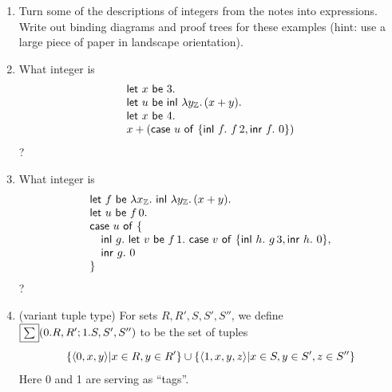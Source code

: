 \documentclass[runningheads,12pt]{llncs}
\newcommand{\itletmac}[2]{\mathsf{let}\ {#2}\ \mathsf{be}\ {#1}.\ }
\newcommand{\leftconn}{\framebox{$\tesum$}}
\newcommand{\lefttagp}{0}
\newcommand{\righttagp}{1}
\newcommand{\itlbe}{\Rightarrow}
\begin{document}
\begin{enumerate}
\item Turn some of the descriptions of integers from the notes into expressions.  Write out binding diagrams and proof trees for these examples (hint: use a large piece of paper in landscape orientation). 
\item What integer is
  \begin{displaymath}
    \begin{array}{l}
    \itletmac{ 3 }{ x } \\ \itletmac{ \ittagl{\lambda y_{\integ}.\, (x + y)} }{ u } \\
 \itletmac{ 4 }{ x }  \\
x + (\itcase u \itof \{ \ittagl{f}\itin f\,2, \ittagr{f}\itin 0 \})
\end{array}
  \end{displaymath}
?
\item What integer is 
  \begin{displaymath}
    \begin{array}{l}
 \itletmac{ \lambda x_{\integ}.\ \ittagl{\lambda y_{\integ}.\,(x+y)} }{ f } \\
    \itletmac{ f\,0 }{ u }   \\
    \itcase u \itof \{ \\ 
 \betwixt \ittagl{g}\itin \itletmac{ f\,1 }{ v }
   \itcase v \itof \{\ittagl{h}\itin g\,3, \ittagr{h}\itin 0 \},  \\
\betwixt \ittagr{g}\itin 0 \\ \}
 \end{array}
  \end{displaymath}
?
\item (variant tuple type) For sets $R,R',S,S',S''$, we define $\leftconn(0.R,R';1.S,S',S'')$ to be the set of tuples
  \begin{displaymath}
    \{ \tuple{\lefttagp,x,y} | x \in R, y \in R' \} \cup \{ \tuple{\righttagp,x,y,z} | x \in S, y \in S', z \in S'' \}
  \end{displaymath}
Here 0 and 1 are serving as ``tags''.



\end{enumerate}
\end{document}
